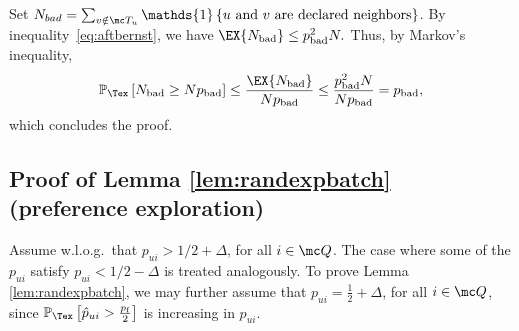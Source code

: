\documentclass{article}
\newcommand\pf{p_{\mathrm{f}}}
\newcommand{\setQ}{\mc Q}
\newcommand\ind[1]{\mathds{1}\left\{#1\right\}}
\renewcommand\PR[2][\Tex]{
\ifthenelse{\equal{#1}{}}{{\mathbb P}\left[#2\right]}{\ensuremath{{\mathbb P}_{#1}\left[ #2\right]}}}
\begin{document}
Set $N_{bad} = \sum_{v \notin \mc T_u} \ind{\text{$u$ and $v$ are declared neighbors}}$. 
By inequality~\eqref{eq:aftbernst}, we have
$
\EX{N_{\text{bad}}} \leq \perrb^2 N. 
$
Thus, by Markov's inequality, 
\[
\PR{ N_{\text{bad}}  \geq N \perrb } 
\leq \frac{\EX{N_{\text{bad}}} }{ N \perrb }
\leq \frac{\perrb^2 N }{ N \perrb }
= \perrb,
\]
which concludes the proof. 


\subsection{Proof of Lemma \ref{lem:randexpbatch} (preference exploration)}

\newcommand\nb{\beta k}
%
Assume w.l.o.g.~that $p_{ui}>1/2 + \Delta$, for all $i \in \setQ$. The case where some of the $p_{ui}$ satisfy $p_{ui} < 1/2 - \Delta$ is treated analogously. 
To prove Lemma \ref{lem:randexpbatch}, we may further assume that  $p_{ui}  = \frac{1}{2} + \Delta$, for all $i \in \setQ$, since $\PR{\hat p_{ui} > \frac{\pf}{2}}$ is increasing in $p_{ui}$. 
\end{document}
